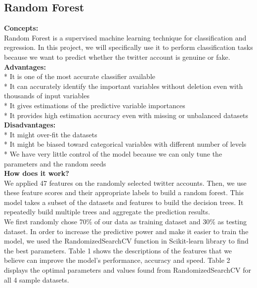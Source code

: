 \documentclass[a4paper, twoside, 12pt]{report}
\begin{document}
\subsection{Random Forest}
\textbf{Concepts:} \\
Random Forest is a supervised machine learning technique for classification and regression. In this project, we will specifically use it to perform classification tasks because  we want to predict whether the twitter account is genuine or fake. \\

\noindent\textbf{Advantages:}\\
* It is one of the most accurate classifier available\\
* It can accurately identify the important variables without deletion even with thousands of input variables\\
* It gives estimations of the predictive variable importances \\
* It provides high estimation accuracy even with missing or unbalanced datasets\\


\noindent\textbf{Disadvantages:}\\
* It might over-fit the datasets\\
* It might be biased toward categorical variables with different number of levels\\
* We have very little control of the model because we can only tune the parameters and the random seeds\\

\noindent \textbf{How does it work?}\\
We applied 47 features on the randomly selected twitter accounts. Then, we use these feature scores and their appropriate labels to build a random forest. This model takes a subset of the datasets and features to build the decision trees. It repeatedly build multiple trees and aggregate the prediction results. \\

\noindent We first randomly chose 70\% of our data as training dataset and 30\% as testing dataset. In order to increase the predictive power and make it easier to train the model, we used the RandomizedSearchCV function in Scikit-learn library to find the best parameters. Table 1 shows the descriptions of the features that we believe can improve the model's performance, accuracy and speed. Table 2 displays the optimal parameters and values found from RandomizedSearchCV for all 4 sample datasets.\\
\end{document}
